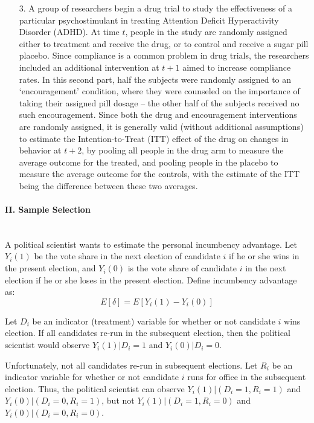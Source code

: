 \documentclass{article}
\begin{document}
\begin{itemize}
\item[3.] A group of researchers begin a drug trial to study the
  effectiveness of a particular psychostimulant in treating Attention
  Deficit Hyperactivity Disorder (ADHD).  At time $t$, people in the
  study are randomly assigned either to treatment and receive the
  drug, or to control and receive a sugar pill placebo. Since
  compliance is a common problem in drug trials, the researchers
  included an additional intervention at $t+1$ aimed to increase
  compliance rates.  In this second part, half the subjects were
  randomly assigned to an `encouragement' condition, where they were
  counseled on the importance of taking their assigned pill dosage --
  the other half of the subjects received no such encouragement.
  Since both the drug and encouragement interventions are randomly
  assigned, it is generally valid (without additional assumptions) to
  estimate the Intention-to-Treat (ITT) effect of the drug on changes
  in behavior at $t+2$, by pooling all people in the drug arm to
  measure the average outcome for the treated, and pooling people in
  the placebo to measure the average outcome for the controls, with
  the estimate of the ITT being the difference between these two
  averages.

\end{itemize}


\paragraph{\Large II. Sample Selection \\ \\}
\vspace{1em}

\noindent A political scientist wants to estimate the personal incumbency
advantage. Let $Y_i(1)$ be the vote share in the next election of
candidate $i$ if he or she wins in the present election, and $Y_i(0)$
is the vote share of candidate $i$ in the next election if he or she
loses in the present election.  Define incumbency advantage as:
$$E[\delta] = E[Y_i(1) - Y_i(0)]$$

Let $D_i$ be an indicator (treatment) variable for whether or not
candidate $i$ wins election. If all candidates re-run in the subsequent
election, then the political scientist would observe $Y_i(1)|D_i = 1$ and
$Y_i(0)|D_i = 0$.

Unfortunately, not all candidates re-run in subsequent elections. Let
$R_i$ be an indicator variable for whether or not candidate $i$ runs for
office in the subsequent election. Thus, the political scientist can
observe $Y_i(1)|(D_i = 1, R_i = 1)$ and $Y_i(0)|(D_i = 0, R_i = 1)$, but not
$Y_i(1)|(D_i = 1, R_i = 0)$ and $Y_i(0)|(D_i = 0, R_i = 0)$.
\end{document}

